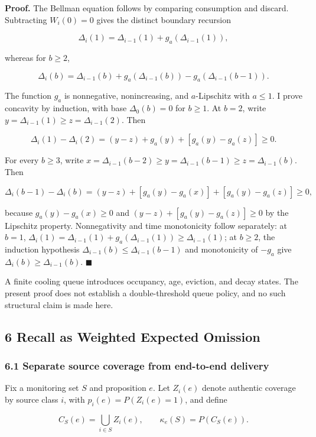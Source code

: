 \documentclass[
  11pt]{article}
\begin{document}
\textbf{Proof.} The Bellman equation follows by comparing consumption
and discard. Subtracting \(W_i(0)=0\) gives the distinct boundary
recursion

\[\Delta_i(1)=\Delta_{i-1}(1)+g_a(\Delta_{i-1}(1)),\]

whereas for \(b\ge2\),

\[\Delta_i(b)=\Delta_{i-1}(b)+g_a(\Delta_{i-1}(b))-g_a(\Delta_{i-1}(b-1)).\]

The function \(g_a\) is nonnegative, nonincreasing, and \(a\)-Lipschitz
with \(a\le1\). I prove concavity by induction, with base
\(\Delta_0(b)=0\) for \(b\ge1\). At \(b=2\), write
\(y=\Delta_{i-1}(1)\ge z=\Delta_{i-1}(2)\). Then

\[\Delta_i(1)-\Delta_i(2)=(y-z)+g_a(y)+[g_a(y)-g_a(z)]\ge0.\]

For every \(b\ge3\), write
\(x=\Delta_{i-1}(b-2)\ge y=\Delta_{i-1}(b-1)\ge z=\Delta_{i-1}(b)\).
Then

\[\Delta_i(b-1)-\Delta_i(b)=(y-z)+[g_a(y)-g_a(x)]+[g_a(y)-g_a(z)]\ge0,\]

because \(g_a(y)-g_a(x)\ge0\) and \((y-z)+[g_a(y)-g_a(z)]\ge0\) by the
Lipschitz property. Nonnegativity and time monotonicity follow
separately: at \(b=1\),
\(\Delta_i(1)=\Delta_{i-1}(1)+g_a(\Delta_{i-1}(1))\ge\Delta_{i-1}(1)\);
at \(b\ge2\), the induction hypothesis
\(\Delta_{i-1}(b)\le\Delta_{i-1}(b-1)\) and monotonicity of \(-g_a\)
give \(\Delta_i(b)\ge\Delta_{i-1}(b)\). \(\blacksquare\)

A finite cooling queue introduces occupancy, age, eviction, and decay
states. The present proof does not establish a double-threshold queue
policy, and no such structural claim is made here.

\subsection{6 Recall as Weighted Expected
Omission}\label{recall-as-weighted-expected-omission}

\subsubsection{6.1 Separate source coverage from end-to-end
delivery}\label{separate-source-coverage-from-end-to-end-delivery}

Fix a monitoring set \(S\) and proposition \(e\). Let \(Z_i(e)\) denote
authentic coverage by source class \(i\), with \(p_i(e)=P(Z_i(e)=1)\),
and define

\[C_S(e)=\bigcup_{i\in S}Z_i(e),\qquad \kappa_e(S)=P(C_S(e)).\]
\end{document}
